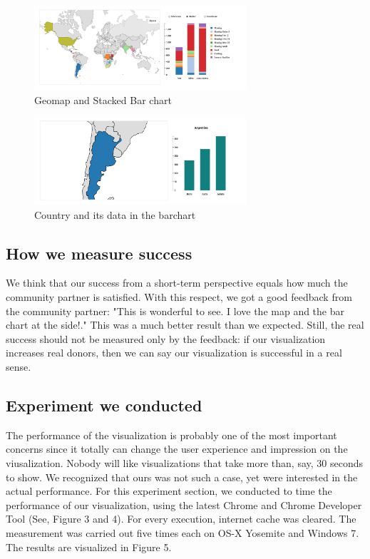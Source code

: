 \documentclass[a4paper]{article}
\begin{document}
\begin{figure}
\centering
\includegraphics[width=0.7\textwidth]{4.png}
\caption{\label{fig:4} Geomap and Stacked Bar chart}
\end{figure}

\begin{figure}
\centering
\includegraphics[width=0.7\textwidth]{5.png}
\caption{\label{fig:5} Country and its data in the barchart}
\end{figure}

\subsection{How we measure success}
We think that our success from a short-term perspective equals how much the community partner is satisfied. With this respect, we got a good feedback from the community partner: "This is wonderful to see. I love the map and the bar chart at the side!." This was a much better result than we expected. Still, the real success should not be measured only by the feedback: if our visualization increases real donors, then we can say our visualization is successful in a real sense.
\subsection{Experiment we conducted}
The performance of the visualization is probably one of the most important concerns since it totally can change the user experience and impression on the viusalization. Nobody will like visualizations that take more than, say, 30 seconds to show. We recognized that ours was not such a case, yet were interested in the actual performance. For this experiment section, we conducted to time the performance of our visualization, using the latest Chrome and Chrome Developer Tool (See, Figure 3 and 4). For every execution, internet cache was cleared. The measurement was carried out five times each on OS-X Yosemite and Windows 7. The results are visualized in Figure 5.
\end{document}
